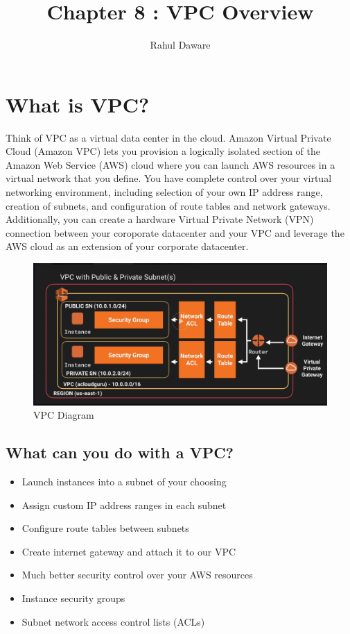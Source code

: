 \documentclass{article}
\author{Rahul Daware}
\begin{document}
\title{Chapter 8 : VPC Overview}
\maketitle
\newpage
\tableofcontents
\newpage

\section{What is VPC?}
Think of VPC as a virtual data center in the cloud. Amazon Virtual Private Cloud (Amazon VPC) lets you provision a logically isolated section of  the Amazon Web Service (AWS) cloud where you can launch AWS resources in a virtual network that you define. You have complete control over your virtual networking environment, including selection of your own IP address range, creation of subnets, and configuration of route tables and network gateways. Additionally, you can create a hardware Virtual Private Network (VPN) connection between your coroporate datacenter and your VPC and leverage the AWS cloud as an extension of your corporate datacenter.

\begin{figure}

  \includegraphics[width =\linewidth]{images/vpc1.png}
  \caption{VPC Diagram}
  \label{fig:VPC Diagram}
\end{figure}

\subsection{What can you do with a VPC?}
\begin{itemize}
\item
Launch instances into a subnet of your choosing

\item
Assign custom IP address ranges in each subnet

\item
Configure route tables between subnets

\item
Create internet gateway and attach it to our VPC

\item
Much better security control over your AWS resources

\item
Instance security groups

\item
Subnet network access control lists (ACLs)

\end{itemize}
\end{document}

